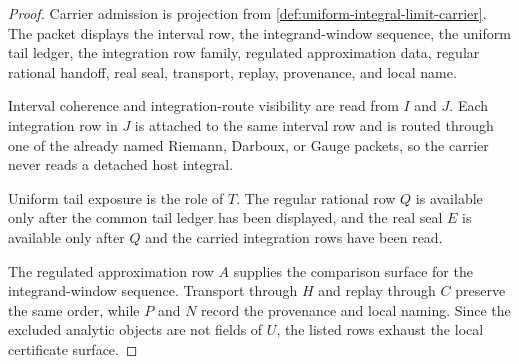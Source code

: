 \begin{proof}
Carrier admission is projection from \autoref{def:uniform-integral-limit-carrier}. The packet displays the interval row, the integrand-window sequence, the uniform tail ledger, the integration row family, regulated approximation data, regular rational handoff, real seal, transport, replay, provenance, and local name.

Interval coherence and integration-route visibility are read from $I$ and $J$. Each integration row in $J$ is attached to the same interval row and is routed through one of the already named Riemann, Darboux, or Gauge packets, so the carrier never reads a detached host integral.

Uniform tail exposure is the role of $T$. The regular rational row $Q$ is available only after the common tail ledger has been displayed, and the real seal $E$ is available only after $Q$ and the carried integration rows have been read.

The regulated approximation row $A$ supplies the comparison surface for the integrand-window sequence. Transport through $H$ and replay through $C$ preserve the same order, while $P$ and $N$ record the provenance and local naming. Since the excluded analytic objects are not fields of $U$, the listed rows exhaust the local certificate surface.
\end{proof}

